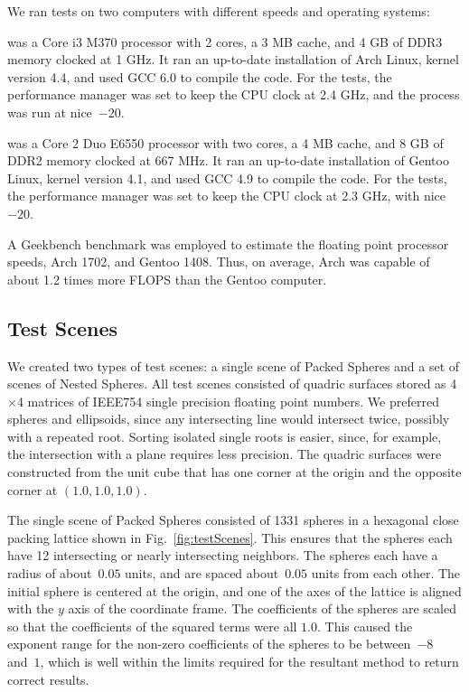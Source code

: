 \documentclass{cccg16}
\begin{document}
We ran tests on two computers with different speeds and operating
systems:

 was a Core i3 M370 processor with 2 cores, a 3 MB
cache, and 4 GB of DDR3 memory clocked at 1 GHz.  It ran an up-to-date
installation of Arch Linux, kernel version 4.4, and used GCC 6.0
to compile the code.  For the tests, the performance manager was set
to keep the CPU clock at 2.4 GHz, and the process was run at nice~$-20$.

 was a Core 2 Duo E6550 processor with two cores,
a 4 MB cache, and 8 GB of DDR2 memory clocked at 667 MHz.  It ran an
up-to-date installation of Gentoo Linux, kernel version 4.1, and used GCC
4.9 to compile the code.  For the tests, the performance
manager was set to keep the CPU clock at 2.3 GHz, with nice~$-20$.

A Geekbench benchmark was employed to estimate the floating point
processor speeds, Arch 1702, and Gentoo 1408. Thus, on average, Arch
was capable of about 1.2 times more FLOPS than the Gentoo computer.

\subsection{Test Scenes}
We created two types of test scenes: a single scene of Packed Spheres
and  a set of scenes of Nested Spheres.  All test scenes consisted
of quadric surfaces stored as 4$\times$4 matrices of IEEE754 single precision floating point
numbers.  We preferred spheres and ellipsoids, since any intersecting
line would intersect twice, possibly with a repeated root.  Sorting
isolated single roots is easier, since, for example, the intersection
with a plane requires less precision. The quadric surfaces were
constructed from the unit cube that has one corner at the origin and
the opposite corner at $(1.0, 1.0, 1.0)$.

The single scene of Packed Spheres consisted of 1331 spheres in a
hexagonal close packing lattice shown in Fig.~\ref{fig:testScenes}.
This ensures that the spheres each have 12 intersecting or nearly
intersecting neighbors.  The spheres each have a radius of
about~$0.05$ units, and are spaced about~$0.05$ units from each other.
The initial sphere is centered at the origin, and one of the axes of
the lattice is aligned with the $y$ axis of the coordinate frame.  The
coefficients of the spheres are scaled so that the coefficients of the
squared terms were all $1.0$. This caused the exponent range for the
non-zero coefficients of the spheres to be between~$-8$ and~$1$, which
is well within the limits required for the resultant method to return
correct results.
\end{document}
